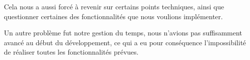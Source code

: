 \documentclass[12pt]{report}
\begin{document}
Cela nous a aussi forcé à revenir sur certains points techniques,
ainsi que questionner certaines des fonctionnalités que nous voulions
implémenter.

Un autre problème fut notre gestion du temps, nous n'avions pas
suffisamment avancé au début du développement, ce qui a eu pour
conséquence l'impossibilité de réaliser toutes les fonctionnalités prévues.
\end{document}
